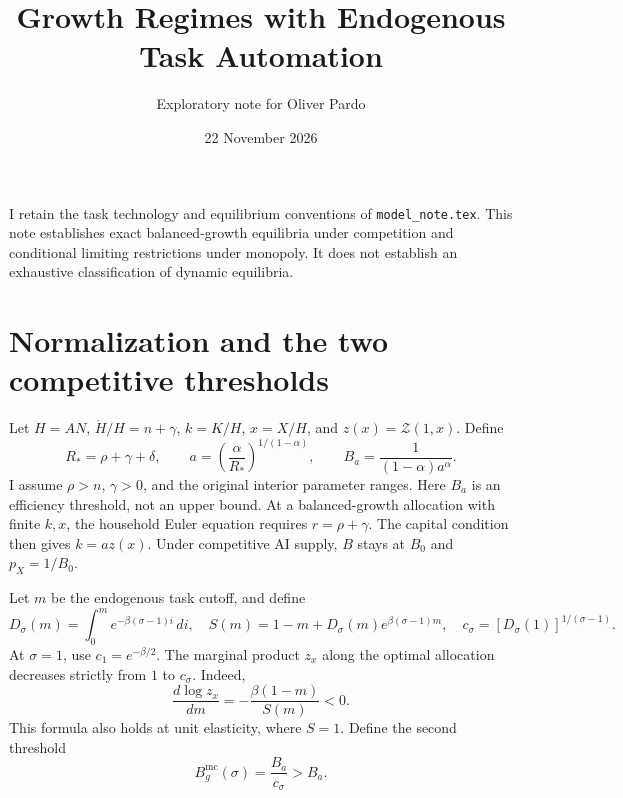 \documentclass[11pt]{article}
\title{Growth Regimes with Endogenous Task Automation}
\author{Exploratory note for Oliver Pardo}
\date{22 November 2026}
\begin{document}
\maketitle
I retain the task technology and equilibrium conventions of
\texttt{model\_note.tex}. This note establishes exact balanced-growth equilibria
under competition and conditional limiting restrictions under monopoly.
It does not establish an exhaustive classification of dynamic equilibria.

\section{Normalization and the two competitive thresholds}
Let $H=AN$, $\dot H/H=n+\gamma$, $k=K/H$, $x=X/H$, and
$z(x)=\mathcal Z(1,x)$. Define
\[
 R_* =\rho+\gamma+\delta,\qquad
 a=\left(\frac{\alpha}{R_*}\right)^{1/(1-\alpha)},\qquad
 B_a=\frac1{(1-\alpha)a^\alpha}.
\]
I assume $\rho>n$, $\gamma>0$, and the original interior parameter ranges.
Here $B_a$ is an efficiency threshold, not an upper bound. At a balanced-growth
allocation with finite $k,x$, the household Euler equation requires
$r=\rho+\gamma$. The capital condition then gives $k=a z(x)$.
Under competitive AI supply, $B$ stays at $B_0$ and $p_X=1/B_0$.

Let $m$ be the endogenous task cutoff, and define
\[
 D_\sigma(m)=\int_0^m e^{-\beta(\sigma-1)i}\,di,\quad
 S(m)=1-m+D_\sigma(m)e^{\beta(\sigma-1)m},\quad
 c_\sigma=\left[D_\sigma(1)\right]^{1/(\sigma-1)}.
\]
At $\sigma=1$, use $c_1=e^{-\beta/2}$.
The marginal product $z_x$ along the optimal allocation decreases strictly
from $1$ to $c_\sigma$. Indeed,
\[
 \frac{d\log z_x}{dm}=-\frac{\beta(1-m)}{S(m)}<0.
\]
This formula also holds at unit elasticity, where $S=1$.
Define the second threshold
\begin{equation}
 B_g^{\mathrm{mc}}(\sigma)=\frac{B_a}{c_\sigma}>B_a.
 \label{eq:regimes-comp-threshold}
\end{equation}
\end{document}
